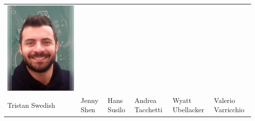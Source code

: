 \documentclass[landscape,a0paper,fontscale=0.292]{baposter}
\begin{document}
\begin{poster}
{\begin{center}
\begin{tabularx}{\linewidth}{X X X X X X}
{\centering \includegraphics[width=0.6\linewidth]{valerio.jpg}}\\ 

{\tiny \centering Tristan Swedish }& {\tiny \centering Jenny Shen }& {\tiny \centering Hans Susilo }& {\tiny \centering Andrea Tacchetti }& {\tiny \centering Wyatt Ubellacker }& {\tiny \centering Valerio Varricchio }\\ 
 
 
            \end{tabularx}
            \end{center}
            
            }

\end{poster}%
%
\end{document}
